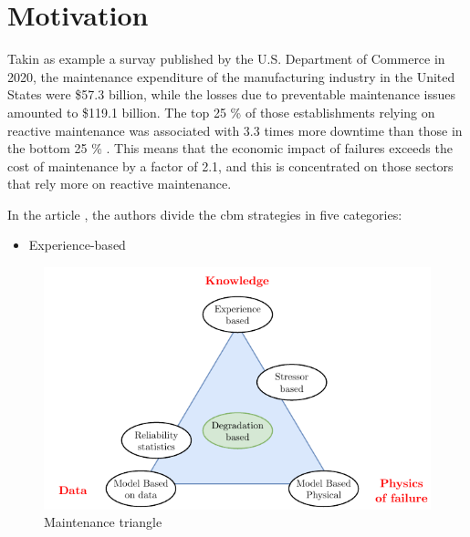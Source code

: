 \section{Motivation}
\label{sec:motivation}

Takin as example a survay published by the U.S. Department of Commerce in 2020, the maintenance expenditure of the manufacturing industry in the United States were \$57.3 billion, while the losses due to preventable maintenance issues amounted to \$119.1 billion. The top 25 \% of those 
establishments relying on reactive maintenance was associated with 3.3 times more downtime 
than those in the bottom 25 \% \cite{NIST}. This means that the economic impact of failures exceeds the cost of maintenance by a factor of 2.1, and this is concentrated on those sectors that rely more on reactive maintenance.

In the article \cite{Maintenance_cat}, the authors divide the \gls{cbm} strategies in five categories:
\begin{itemize}
    \item Experience-based 
\end{itemize}

\begin{figure}
    \centering
    \includegraphics[scale=1.3]{images/Intro/MaintTriangle.pdf}
    \caption{Maintenance triangle \cite{Maintenance_cat}}
    \label{fig:MaintTriangle}
\end{figure} 